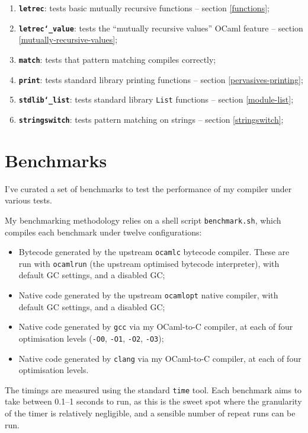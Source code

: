 \documentclass[12pt,a4paper,twoside,openright]{report}
\begin{document}
\begin{enumerate}
    \item \textbf{\texttt{letrec}}: tests basic mutually recursive functions --
        section \ref{functions};
    \item \textbf{\texttt{letrec\char`_value}}: tests the ``mutually recursive
        values'' OCaml feature -- section \ref{mutually-recursive-values};
    \item \textbf{\texttt{match}}: tests that pattern matching compiles
        correctly;
    \item \textbf{\texttt{print}}: tests standard library printing functions --
        section \ref{pervasives-printing};
    \item \textbf{\texttt{stdlib\char`_list}}: tests standard library
        \lstinline!List! functions -- section \ref{module-list};
    \item \textbf{\texttt{stringswitch}}: tests pattern matching on strings --
        section \ref{stringswitch};
\end{enumerate}

\section{Benchmarks}\label{benchmarks}

I've curated a set of benchmarks to test the performance of my compiler under
various tests.

My benchmarking methodology relies on a shell script \lstinline!benchmark.sh!,
which compiles each benchmark under twelve configurations:
\begin{itemize}
    \item Bytecode generated by the upstream \lstinline!ocamlc! bytecode compiler. These are run with \lstinline!ocamlrun! (the upstream optimised bytecode interpreter), with default GC settings, and a disabled GC;
    \item Native code generated by the upstream \lstinline!ocamlopt! native compiler, with default GC settings, and a disabled GC;
    \item Native code generated by \lstinline!gcc! via my OCaml-to-C compiler, at each of four optimisation levels (\lstinline!-O0!, \lstinline!-O1!, \lstinline!-O2!, \lstinline!-O3!);
    \item Native code generated by \lstinline!clang! via my OCaml-to-C compiler, at each of four optimisation levels.
\end{itemize}

The timings are measured using the standard \lstinline!time! tool. Each
benchmark aims to take between 0.1--1 seconds to run, as this is the sweet spot
where the granularity of the timer is relatively negligible, and a sensible
number of repeat runs can be run.
\end{document}
